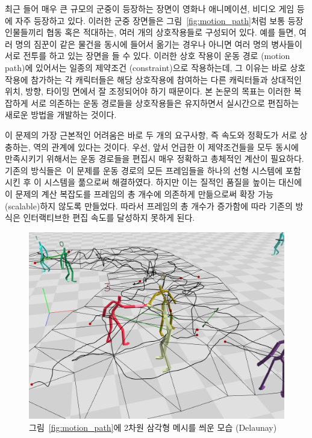 \documentclass[12pt,a4paper,oneside,final]{report}
\newcommand{\KimKwon}{\cite{Kim:2009:SMM:1531326.1531385,Kwon:2008:GME:1360612.1360679}}
\begin{document}
최근 들어 매우 큰 규모의 군중이 등장하는 장면이 영화나 애니메이션, 비디오 게임
등에 자주 등장하고 있다. 이러한 군중 장면들은 그림~\ref{fig:motion_path}처럼
보통 등장 인물들끼리 협동 혹은 적대하는, 여러 개의 상호작용들로 구성되어 있다.
예를 들면, 여러 명의 짐꾼이 같은 물건을 동시에 들어서 옮기는 경우나 아니면 여러
명의 병사들이 서로 전투를 하고 있는 장면을 들 수 있다. 이러한 상호 작용이 운동
경로 (motion path)에 있어서는 일종의 제약조건 (constraint)으로 작용하는데, 그
이유는 바로 상호작용에 참가하는 각 캐릭터들은 해당 상호작용에 참여하는 다른
캐릭터들과 상대적인 위치, 방향, 타이밍 면에서 잘 조정되어야 하기 때문이다.  본
논문의 목표는 이러한 복잡하게 서로 의존하는 운동 경로들을 상호작용들은
유지하면서 실시간으로 편집하는 새로운 방법을 개발하는 것이다.

이 문제의 가장 근본적인 어려움은 바로 두 개의 요구사항, 즉 속도와 정확도가 서로
상충하는, 역의 관계에 있다는 것이다. 우선, 앞서 언급한 이 제약조건들을 모두
동시에 만족시키기 위해서는 운동 경로들을 편집시 매우 정확하고 총체적인 계산이
필요하다.  기존의 방식들은~\KimKwon 이 문제를 운동 경로의 모든 프레임들을 하나의 선형
시스템에 포함시킨 후 이 시스템을 풂으로써 해결하였다. 하지만 이는 질적인 품질을
높이는 대신에 이 문제의 계산 복잡도를 프레임의 총 개수에 의존하게 만듦으로써
확장 가능 (scalable)하지 않도록 만들었다. 따라서 프레임의 총 개수가 증가함에
따라 기존의 방식은 인터랙티브한 편집 속도를 달성하지 못하게 된다.

\begin{figure}[htb]
\centering
\includegraphics[width=\linewidth]{motion_path_w_mesh_c.png}
\caption{그림~\ref{fig:motion_path}에 2차원 삼각형 메시를 씌운 모습 (Delaunay)}
\label{fig:motion_path_w_mesh}
\end{figure}
 
\end{document}
